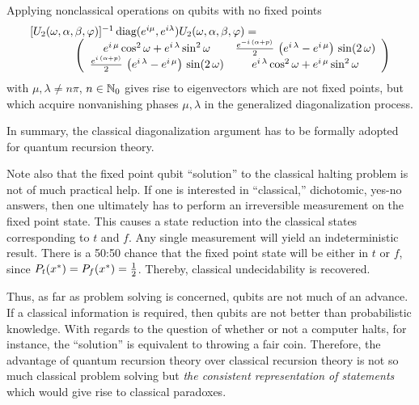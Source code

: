 \documentclass[prl,preprint,showpacs,showkeys,amsfonts,amsmath]{revtex4}
\begin{document}
Applying nonclassical operations on qubits with no fixed points
\begin{equation}
\begin{array}{l}
[U_2(\omega ,\alpha ,\beta ,\varphi )]^{-1}\,\mbox{diag}( e^{i\mu } ,
e^{i\lambda }) U_2(\omega ,\alpha ,\beta ,\varphi )= \\
\qquad
\qquad
\left(
\begin{array}{cc}
  {e^{i\,\mu }}\,{{\cos^2 \omega }} +
     {e^{i\,\lambda }}\,{{\sin^2 \omega }}&
    {{{e^{-i\,\left( \alpha  + p \right) }\over 2}}\,
         \left( {e^{i\,\lambda }} - {e^{i\,\mu }} \right) \,\sin (2\,\omega )}
       \\
{{{e^{i\,\left( \alpha  + p \right) }\over 2}}\,
        \left( {e^{i\,\lambda }} - {e^{i\,\mu }}  \right) \,\sin (2\,\omega )}
       &{e^{i\,\lambda }}\,{{\cos^2 \omega }} +
     {e^{i\,\mu }}\,{{\sin^2 \omega }}
 \end{array}
\right)
 \end{array}
\end{equation}
with $\mu ,\lambda \neq n\pi$, $n\in {\Bbb N}_0$ gives rise to
eigenvectors which are not fixed points, but which acquire nonvanishing
phases $\mu , \lambda$ in the generalized diagonalization process.


In summary, the classical diagonalization argument has to be formally adopted
for quantum recursion theory.

Note also that the fixed point qubit ``solution''
to the classical halting problem is  not of much practical help.
If one is interested in ``classical,'' dichotomic, yes-no answers,
then one ultimately has to perform an
irreversible measurement
on the fixed point state. This  causes a state reduction into the
classical states corresponding to $t$ and $f$.
Any single measurement will yield an indeterministic result.
There is a 50:50 chance that
the fixed point state will be either in $t$ or $f$, since
$P_t(
x ^\ast)=
P_f(
x^\ast )= {1\over 2}$.
Thereby, classical undecidability is recovered.

Thus, as far as problem solving is concerned, qubits are not much of an
advance. If a classical information is required, then qubits are not
better than probabilistic knowledge. With regards to the question of
whether or not a computer halts, for
instance, the ``solution''
is equivalent to  throwing a fair coin.
Therefore, the advantage of quantum recursion theory over classical
recursion theory is not so much classical problem solving but {\em the
consistent representation of statements} which would give rise to
classical paradoxes.
\end{document}
